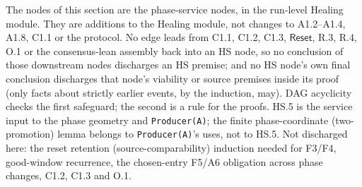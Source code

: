 \documentclass{article}
\begin{document}
The nodes of this section are the phase-service nodes, in the run-level
Healing module.  They are
additions to the Healing module, not changes to A1.2--A1.4, A1.8, C1.1 or the
protocol.  No edge leads from C1.1, C1.2, C1.3, $\mathsf{Reset}$, R.3, R.4,
O.1 or the consensus-lean assembly back into an HS node, so no conclusion of
those downstream nodes discharges an HS premise; and no HS node's own final
conclusion discharges that node's viability or source premises inside its
proof (only facts about strictly earlier events, by the induction, may).  DAG
acyclicity checks the first safeguard; the second is a rule for the proofs.  HS.5 is the service input to
the phase geometry and \texttt{Producer(A)}; the finite phase-coordinate
(two-promotion) lemma belongs to \texttt{Producer(A)}'s uses, not to HS.5.
Not discharged here: the reset retention (source-comparability) induction
needed for F3/F4, good-window recurrence, the chosen-entry F5/A6 obligation
across phase changes, C1.2, C1.3 and O.1.
\end{document}
